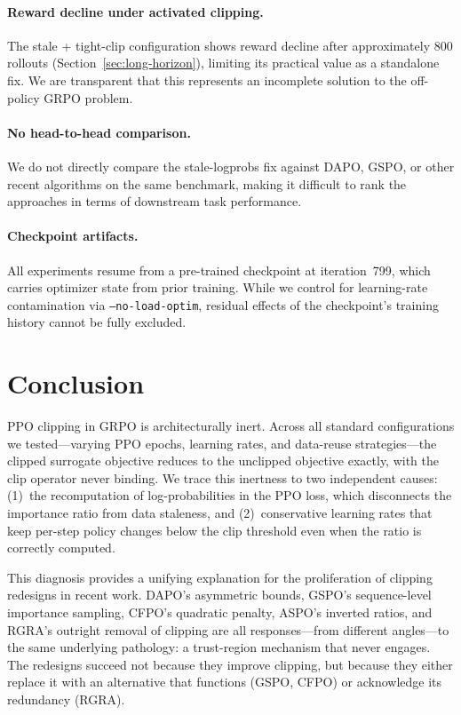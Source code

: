 \paragraph{Reward decline under activated clipping.}
The stale + tight-clip configuration shows reward decline after approximately 800 rollouts (Section~\ref{sec:long-horizon}), limiting its practical value as a standalone fix.
We are transparent that this represents an incomplete solution to the off-policy GRPO problem.

\paragraph{No head-to-head comparison.}
We do not directly compare the stale-logprobs fix against DAPO, GSPO, or other recent algorithms on the same benchmark, making it difficult to rank the approaches in terms of downstream task performance.

\paragraph{Checkpoint artifacts.}
All experiments resume from a pre-trained checkpoint at iteration~799, which carries optimizer state from prior training.
While we control for learning-rate contamination via \texttt{--no-load-optim}, residual effects of the checkpoint's training history cannot be fully excluded.


\section{Conclusion}
\label{sec:conclusion}

PPO clipping in GRPO is architecturally inert.
Across all standard configurations we tested---varying PPO epochs, learning rates, and data-reuse strategies---the clipped surrogate objective reduces to the unclipped objective exactly, with the clip operator never binding.
We trace this inertness to two independent causes: (1)~the recomputation of log-probabilities in the PPO loss, which disconnects the importance ratio from data staleness, and (2)~conservative learning rates that keep per-step policy changes below the clip threshold even when the ratio is correctly computed.

This diagnosis provides a unifying explanation for the proliferation of clipping redesigns in recent work.
DAPO's asymmetric bounds, GSPO's sequence-level importance sampling, CFPO's quadratic penalty, ASPO's inverted ratios, and RGRA's outright removal of clipping are all responses---from different angles---to the same underlying pathology: a trust-region mechanism that never engages.
The redesigns succeed not because they improve clipping, but because they either replace it with an alternative that functions (GSPO, CFPO) or acknowledge its redundancy (RGRA).


